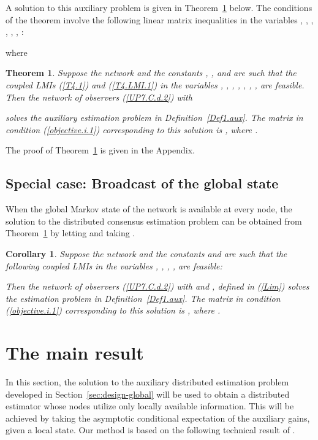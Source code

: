 \documentclass[a4paper,twocolumn]{autart}
\newtheorem{theorem}{Theorem}
\newtheorem{corollary}{Corollary}
\begin{document}
A solution to this auxiliary problem is
given in Theorem~\ref{T.aux} below.  The conditions of
the theorem involve the following linear matrix inequalities in the variables
, , , ,
, , :   

where 



\begin{theorem}\label{T.aux}
Suppose the network  and the constants ,
,  and  are such that 
the coupled LMIs (\ref{T4.1}) and (\ref{T4.LMI.1})
in the variables , , ,
, ,  
, , are feasible. 
Then the network of observers (\ref{UP7.C.d.2}) with

solves the auxiliary estimation problem in Definition~\ref{Def1.aux}. The
matrix  in condition (\ref{objective.i.1}) 
corresponding to this solution is ,
where .  
\end{theorem}

The proof of Theorem~\ref{T.aux} is given in the Appendix. 

\subsection{Special case: Broadcast of the global state}   

When the global Markov state of the network is available at
every node, the solution to the distributed
 consensus estimation problem can be obtained from
Theorem~\ref{T.aux} by letting  
 and taking
.

\begin{corollary}\label{Corollary}
Suppose the network  and the constants 
and  are such that the following coupled LMIs in the variables 
, ,  
, , are feasible:

Then the network of observers (\ref{UP7.C.d.2}) with
 and , 
defined in (\ref{Lim})
solves the estimation problem in Definition~\ref{Def1.aux}. The
matrix  in condition (\ref{objective.i.1})
corresponding to this solution is ,
where .  
\end{corollary}


\section{The main result}\label{main}

In this section, the solution to the auxiliary distributed estimation
problem developed in Section~\ref{sec:design-global}  will be used to
obtain a distributed estimator whose nodes utilize only locally available 
information. This will be achieved by  
taking the asymptotic conditional expectation of the auxiliary gains, given 
a local state. 
Our method is based on the following
technical result of \cite{XiUP1}. 
\end{document}
